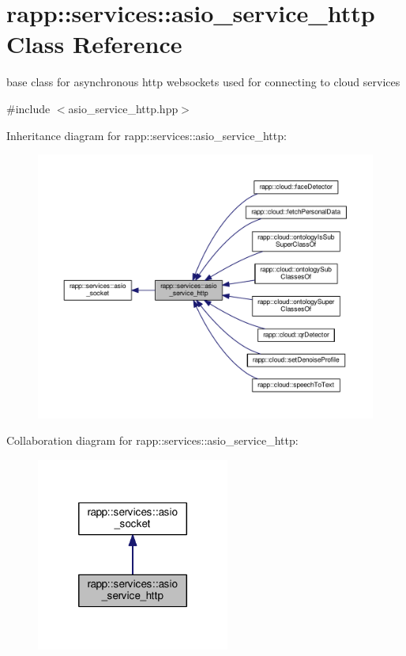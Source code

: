 \hypertarget{classrapp_1_1services_1_1asio__service__http}{\section{rapp\-:\-:services\-:\-:asio\-\_\-service\-\_\-http Class Reference}
\label{classrapp_1_1services_1_1asio__service__http}
}


base class for asynchronous http websockets used for connecting to cloud services  




{\ttfamily \#include $<$asio\-\_\-service\-\_\-http.\-hpp$>$}



Inheritance diagram for rapp\-:\-:services\-:\-:asio\-\_\-service\-\_\-http\-:
\nopagebreak
\begin{figure}[H]
\begin{center}
\leavevmode
\includegraphics[width=350pt]{classrapp_1_1services_1_1asio__service__http__inherit__graph}
\end{center}
\end{figure}


Collaboration diagram for rapp\-:\-:services\-:\-:asio\-\_\-service\-\_\-http\-:
\nopagebreak
\begin{figure}[H]
\begin{center}
\leavevmode
\includegraphics[width=180pt]{classrapp_1_1services_1_1asio__service__http__coll__graph}
\end{center}
\end{figure}
